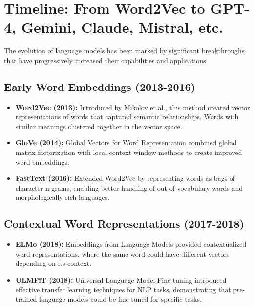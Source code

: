 \documentclass[11pt,a4paper]{report}
\begin{document}
\section{Timeline: From Word2Vec to GPT-4, Gemini, Claude, Mistral, etc.}

The evolution of language models has been marked by significant breakthroughs that have progressively increased their capabilities and applications:

\subsection{Early Word Embeddings (2013-2016)}
\begin{itemize}
    \item \textbf{Word2Vec (2013):} Introduced by Mikolov et al., this method created vector representations of words that captured semantic relationships. Words with similar meanings clustered together in the vector space.
    
    \item \textbf{GloVe (2014):} Global Vectors for Word Representation combined global matrix factorization with local context window methods to create improved word embeddings.
    
    \item \textbf{FastText (2016):} Extended Word2Vec by representing words as bags of character n-grams, enabling better handling of out-of-vocabulary words and morphologically rich languages.
\end{itemize}

\subsection{Contextual Word Representations (2017-2018)}
\begin{itemize}
    \item \textbf{ELMo (2018):} Embeddings from Language Models provided contextualized word representations, where the same word could have different vectors depending on its context.
    
    \item \textbf{ULMFiT (2018):} Universal Language Model Fine-tuning introduced effective transfer learning techniques for NLP tasks, demonstrating that pre-trained language models could be fine-tuned for specific tasks.
\end{itemize}
\end{document}
